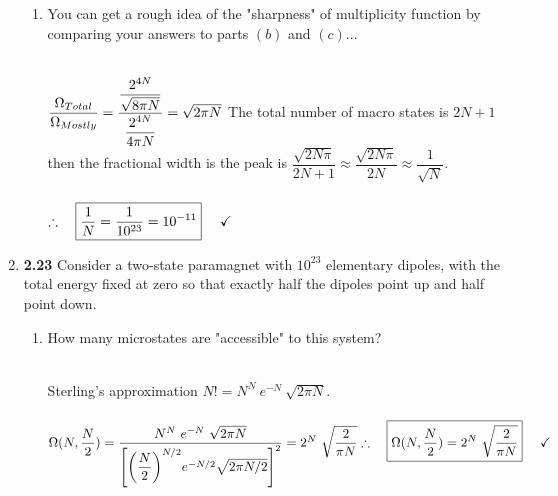 \documentclass[fleqn]{article}
\begin{document}
\begin{enumerate}
\begin{enumerate}
      \item You can get a rough idea of the "sharpness" of multiplicity function by comparing your answers to parts $(b)$
      and $(c)$...

        \textcolor{hwColor}{
          \\
          $
            \dfrac{\Omega_{Total}}{\Omega_{Mostly}}
            =\dfrac{
              \dfrac{2^{4N}}{\sqrt{8 \pi N}}
            }{
              \dfrac{2^{4N}}{4 \pi N}
            }=\sqrt{2 \pi N}
            \\
            \\
          $
          The total number of macro states is $2N+1$ then the fractional width is the peak is 
          $\dfrac{\sqrt{2N\pi}}{2N+1} \approx \dfrac{\sqrt{2N\pi}}{2N} \approx \dfrac{1}{\sqrt{N}}$.
          \\
          \\
          $
            \therefore ~~~ \boxed{
              \dfrac{1}{N}=\dfrac{1}{10^{23}}=10^{-11}
            } ~~~~ \checkmark
            \\
            \\
          $
        }

    \end{enumerate}

    \item \textbf{2.23} Consider a two-state paramagnet with $10^{23}$ elementary dipoles, with the total energy fixed 
    at zero so that exactly half the dipoles point up and half point down.
    \begin{enumerate}
      \item How many microstates are "accessible" to this system?

        \textcolor{hwColor}{
          \\
          Sterling's approximation $N!=N^N ~ e^{-N} ~ \sqrt{2\pi N}$. 
          \\
          \\
          $
            \Omega(N, \dfrac{N}{2})=\dfrac{
              N^N ~ e^{-N} ~ \sqrt{2\pi N}
            }{
              \left[\bigg( \dfrac{N}{2} \bigg)^{N/2}  e^{-N/2}  \sqrt{2 \pi N/2 } \right]^2
            }=2^N ~ \sqrt{\dfrac{2}{\pi N}}
            \\
            \\
            \\
            \therefore ~~~ \boxed{
              \Omega(N, \dfrac{N}{2})=2^N ~ \sqrt{\dfrac{2}{\pi N}}
            } ~~~~ \checkmark
            \\
          $
        }


\end{enumerate}
\end{enumerate}
\end{document}
